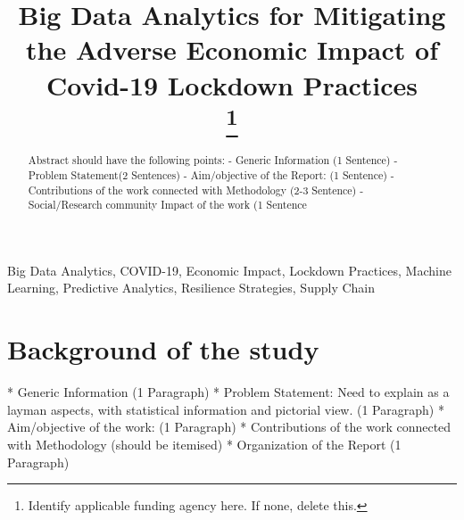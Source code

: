 \documentclass[conference]{IEEEtran}
\begin{document}
\title{Big Data Analytics for Mitigating the Adverse Economic Impact of Covid-19 Lockdown Practices\\

\thanks{Identify applicable funding agency here. If none, delete this.}
}

\author{
\and
{}
}

\maketitle

\begin{abstract}
Abstract should have the following points:
-	Generic Information (1 Sentence)
-	Problem Statement(2 Sentences)
-	Aim/objective of the Report: (1 Sentence)
-	Contributions of the work connected with Methodology (2-3 Sentence)
-	Social/Research community Impact of the work (1 Sentence

\end{abstract}

\begin{IEEEkeywords}
Big Data Analytics, COVID-19, Economic Impact, Lockdown Practices, Machine Learning, Predictive Analytics, Resilience Strategies, Supply Chain
\end{IEEEkeywords}

\section{Background of the study}
* Generic Information (1 Paragraph)
* Problem Statement: Need to explain as a layman aspects, with statistical information and pictorial view. (1 Paragraph)
* Aim/objective of the work: (1 Paragraph)
* Contributions of the work connected with Methodology (should be itemised)
* Organization of the Report (1 Paragraph)
\end{document}
